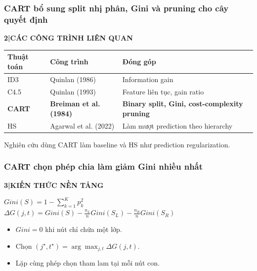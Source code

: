 \documentclass[aspectratio=169,12pt]{beamer}
\renewcommand{\arraystretch}{1.18}
\newcommand{\chaptertag}[2]{%
  \vspace{-0.16cm}%
  {\scriptsize\bfseries\textcolor{boxframe}{#1\enspace |\enspace #2}}\par
  \vspace{0.12cm}%
}
\begin{document}
\begin{frame}
  \frametitle{CART bổ sung split nhị phân, Gini và pruning cho cây quyết định}
  \chaptertag{2}{CÁC CÔNG TRÌNH LIÊN QUAN}
  \small
  {\renewcommand{\arraystretch}{1.28}%
  \begin{tabularx}{\textwidth}{@{}L{2.2cm}L{2.8cm}Y@{}}
    \toprule
    \textbf{Thuật toán} & \textbf{Công trình} & \textbf{Đóng góp} \\
    \midrule
    ID3 & Quinlan (1986) & Information gain \\
    C4.5 & Quinlan (1993) & Feature liên tục, gain ratio \\
    \textcolor{primaryblue}{\textbf{CART}} & \textcolor{primaryblue}{\textbf{Breiman et al. (1984)}} & \textcolor{primaryblue}{\textbf{Binary split, Gini, cost-complexity pruning}} \\
    HS & Agarwal et al. (2022) & Làm mượt prediction theo hierarchy \\
    \bottomrule
  \end{tabularx}}
  \par\vspace{0.42cm}
  \begin{center}
    Nghiên cứu dùng CART làm baseline và HS như prediction regularization.
  \end{center}
\end{frame}

\begin{frame}
  \frametitle{CART chọn phép chia làm giảm Gini nhiều nhất}
  \chaptertag{3}{KIẾN THỨC NỀN TẢNG}
  \begin{tcolorbox}[focusbox,width=0.90\textwidth,top=3mm,bottom=3mm]
    \centering
    $\displaystyle Gini(S)=1-\sum_{k=1}^{K}p_k^2$\\[0.32cm]
    $\displaystyle \Delta G(j,t)=Gini(S)-\frac{n_L}{n}Gini(S_L)-\frac{n_R}{n}Gini(S_R)$
  \end{tcolorbox}
  \vspace{0.38cm}
  \begin{itemize}
    \item $Gini=0$ khi nút chỉ chứa một lớp.
    \item Chọn $(j^\star,t^\star)=\arg\max_{j,t}\Delta G(j,t)$.
    \item Lặp cùng phép chọn tham lam tại mỗi nút con.
  \end{itemize}
\end{frame}
\end{document}
